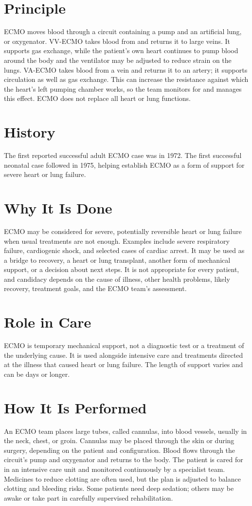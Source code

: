 \section*{Principle}
ECMO moves blood through a circuit containing a pump and an artificial lung, or oxygenator. VV-ECMO takes blood from and returns it to large veins. It supports gas exchange, while the patient's own heart continues to pump blood around the body and the ventilator may be adjusted to reduce strain on the lungs. VA-ECMO takes blood from a vein and returns it to an artery; it supports circulation as well as gas exchange. This can increase the resistance against which the heart's left pumping chamber works, so the team monitors for and manages this effect. ECMO does not replace all heart or lung functions.

\section*{History}
The first reported successful adult ECMO case was in 1972. The first successful neonatal case followed in 1975, helping establish ECMO as a form of support for severe heart or lung failure.

\section*{Why It Is Done}
ECMO may be considered for severe, potentially reversible heart or lung failure when usual treatments are not enough. Examples include severe respiratory failure, cardiogenic shock, and selected cases of cardiac arrest. It may be used as a bridge to recovery, a heart or lung transplant, another form of mechanical support, or a decision about next steps. It is not appropriate for every patient, and candidacy depends on the cause of illness, other health problems, likely recovery, treatment goals, and the ECMO team's assessment.

\section*{Role in Care}
ECMO is temporary mechanical support, not a diagnostic test or a treatment of the underlying cause. It is used alongside intensive care and treatments directed at the illness that caused heart or lung failure. The length of support varies and can be days or longer.

\section*{How It Is Performed}
An ECMO team places large tubes, called cannulas, into blood vessels, usually in the neck, chest, or groin. Cannulas may be placed through the skin or during surgery, depending on the patient and configuration. Blood flows through the circuit's pump and oxygenator and returns to the body. The patient is cared for in an intensive care unit and monitored continuously by a specialist team. Medicines to reduce clotting are often used, but the plan is adjusted to balance clotting and bleeding risks. Some patients need deep sedation; others may be awake or take part in carefully supervised rehabilitation.

